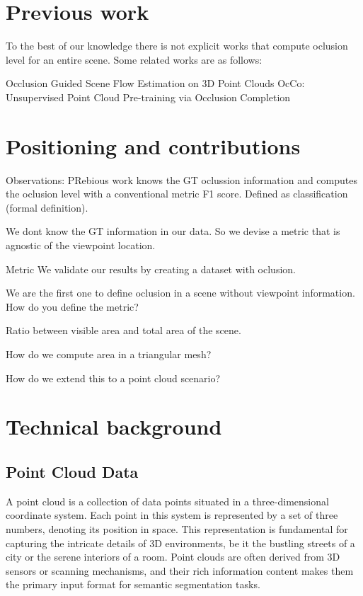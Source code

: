 \documentclass[11pt, a4paper,oneside,chapterprefix=false]{scrbook}
\begin{document}
\section{Previous work}
To the best of our knowledge there is not explicit works that compute oclusion level for an entire scene.
Some related works are as follows:

Occlusion Guided Scene Flow Estimation on 3D Point Clouds
OcCo: Unsupervised Point Cloud Pre-training via Occlusion Completion

\section{Positioning and contributions}

Observations: PRebious work knows the GT oclussion information and computes the oclusion level with a conventional metric F1 score. 
Defined as classification (formal definition).

We dont know the  GT information in our data. So we devise a metric that is agnostic of the viewpoint location.


Metric 
We validate our results by creating a dataset with oclusion.

We are the first one to define oclusion in a scene without viewpoint information.
How do you define the metric?

Ratio between visible area and total area of the scene.

How do we compute area in a triangular mesh?

How do we extend this to a point cloud scenario?

\section{Technical background}
\subsection{Point Cloud Data}

A point cloud is a collection of data points situated in a three-dimensional coordinate system. Each point in this system is represented by a set of three numbers, denoting its position in space. This representation is fundamental for capturing the intricate details of 3D environments, be it the bustling streets of a city or the serene interiors of a room. Point clouds are often derived from 3D sensors or scanning mechanisms, and their rich information content makes them the primary input format for semantic segmentation tasks.
\end{document}
